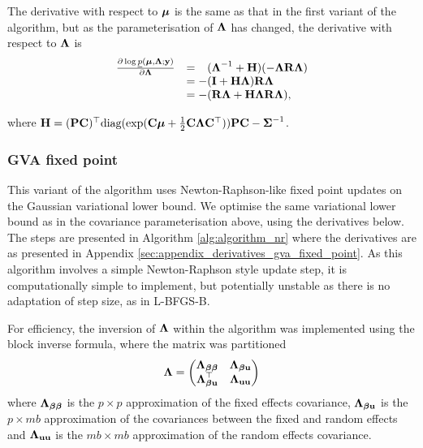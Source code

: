 \noindent The derivative with respect to ${\boldsymbol \mu}$ is the same as that in the
first variant of the algorithm, but as the parameterisation of ${\boldsymbol \Lambda}$ has
changed, the  derivative with respect to ${\boldsymbol \Lambda}$ is 
\begin{equation}
\label{eq:gva_lower_bound_precision_deriv}
\begin{array}{ll}
	\frac{\partial \log \underline{p}({\boldsymbol \mu}, {\boldsymbol \Lambda}; {\bf y})}{\partial {\boldsymbol\Lambda}}
	  & = \hphantom{-}({\boldsymbol \Lambda}^{-1} + {\bf H})(-{\boldsymbol \Lambda} {\bf R} {\boldsymbol \Lambda}) \\
	  & = -({\bf I} + {\bf H}{\boldsymbol \Lambda}){\bf R}{\boldsymbol \Lambda} \\
	  & = - ({\bf R}{\boldsymbol \Lambda} + {\bf H}{\boldsymbol \Lambda}{\bf R}{\boldsymbol \Lambda}),
\end{array}
\end{equation}
		
\noindent where ${\bf H} = ({\bf P} {\bf C})^\top \text{diag}(\exp({\bf C} {\boldsymbol \mu} + \frac{1}{2}
{\bf C} {\boldsymbol \Lambda} {\bf C}^\top)) {\bf P} {\bf C} - {\boldsymbol \Sigma}^{-1}$.
		
\subsubsection{GVA fixed point} 	%

This variant of the algorithm uses Newton-Raphson-like fixed point updates on
the Gaussian variational lower bound. We optimise the same variational lower
bound as in the covariance parameterisation above, using the derivatives below.
The steps are presented in Algorithm \ref{alg:algorithm_nr} where   the
derivatives are as presented in Appendix
\ref{sec:appendix_derivatives_gva_fixed_point}. As this algorithm involves a
simple Newton-Raphson style update step, it is computationally simple to
implement, but potentially unstable as there is no adaptation of step size, as
in L-BFGS-B.

For efficiency, the inversion of ${\boldsymbol \Lambda}$ within the algorithm was
implemented using the block inverse formula, where	the matrix was partitioned
\[
	{\boldsymbol \Lambda} =
	\begin{pmatrix}
		{\boldsymbol\Lambda}_{{\boldsymbol \beta} {\boldsymbol \beta}} & {\boldsymbol \Lambda}_{{\boldsymbol \beta} {\bf u}} \\
		{\boldsymbol \Lambda}_{{\boldsymbol \beta} {\bf u}}^\top & {\boldsymbol \Lambda}_{{\bf u} {\bf u}}
	\end{pmatrix}
\]
where ${\boldsymbol \Lambda}_{{\boldsymbol \beta} {\boldsymbol \beta}}$ is the $p \times p$ approximation of the fixed
effects covariance, ${\boldsymbol \Lambda}_{{\boldsymbol \beta} {\bf u}}$ is the $p \times mb$ approximation
of the covariances between the fixed and random effects and ${\boldsymbol \Lambda}_{{\bf u}
{\bf u}}$ is the $mb \times mb$ approximation of the random effects covariance.

